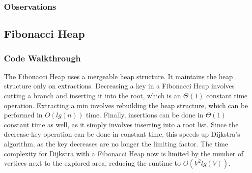 \documentclass[a4paper,12pt]{article}
\begin{document}
\subsubsection{Observations}
\subsection{Fibonacci Heap}
\subsubsection{Code Walkthrough}

The Fibonacci Heap uses a mergeable heap structure. It maintains the heap structure only on extractions. Decreasing a key in a Fibonacci Heap involves cutting a branch and inserting it into the root, which is an $\Theta(1)$ constant time operation. Extracting a min involves rebuilding the heap structure, which can be performed in $O(lg(n))$ time. Finally, insertions can be done in $\Theta(1)$ constant time as well, as it simply involves inserting into a root list. Since the decrease-key operation can be done in constant time, this speeds up Dijkstra's algorithm, as the key decreases are no longer the limiting factor. The time complexity for Dijkstra with a Fibonacci Heap now is limited by the number of vertices next to the explored area, reducing the runtime to $O(V^2lg(V))$.
\end{document}
